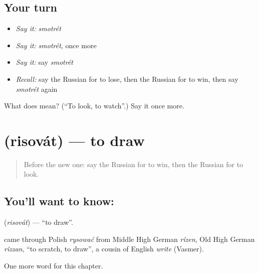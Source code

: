 \subsection*{Your turn}
\begin{itemize}
\raggedright
  \item \emph{Say it:} \emph{smotrét}
  \item \emph{Say it:} \emph{smotrét}, once more
  \item \emph{Say it:} say \emph{smotrét}
  \item \emph{Recall:} say the Russian for to lose, then the Russian for to win, then say \emph{smotrét} again
\end{itemize}

\begin{tcolorbox}[breakable,colback=teal!4,colframe=teal!35!black,title={Before you move on}]
What does  mean? (\textquotedblleft{}To look, to watch\textquotedblright{}.) Say it once more.
\end{tcolorbox}
\section[\texorpdfstring{\ru{рисовать} (risovát)}{рисовать (risovát)}]{ (risovát) — to draw}

\label{lesson:RU-C135-to-draw}



\begin{quote}
Before the new one: say the Russian for to win, then the Russian for to look.
\end{quote}

\subsection*{You'll want to know: }
\textbf{} (\emph{risovát}) — \textquotedblleft{}to draw\textquotedblright{}.

\begin{cousinweb}
\textbf{} came through Polish \emph{rysować} from Middle High German \emph{rîzen}, Old High German \emph{rîzzan}, \textquotedblleft{}to scratch, to draw\textquotedblright{}, a cousin of English \emph{write} (Vasmer).
\end{cousinweb}

\begin{grammarlens}[title={What you've built}]
One more word for this chapter.
\end{grammarlens}

